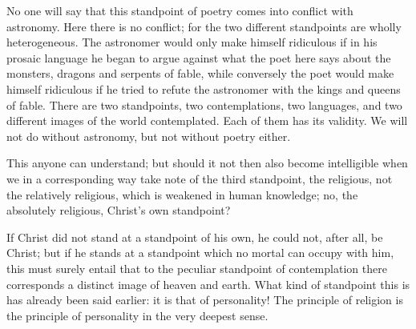 \documentclass[12pt]{book}
\newcommand{\opage}[1]{\marginnote{\footnotesize\textit{[#1]}}}
\begin{document}
No one will say that this standpoint of poetry comes into conflict with
astronomy. Here there is no conflict; for the two different standpoints
are wholly heterogeneous. The astronomer would only make himself ridiculous
if in his prosaic language he began to argue against what the poet here
says about the monsters, dragons and serpents of fable, while conversely
the poet would make himself ridiculous if he tried to refute the astronomer
with the kings and queens of fable. There are two standpoints, two
contemplations, two languages, and two different images of the world
contemplated. Each of them has its validity. We will not do without
astronomy, but not without poetry either.

This anyone can understand; but should it not then also become
intelligible when we in a corresponding way take note of the third
standpoint, the religious, not the relatively religious, which is weakened
in human
\opage{202}\setcounter{footnote}{0}%
knowledge; no, the absolutely religious, Christ's own standpoint?

If Christ did not stand at a standpoint of his own, he could not, after
all, be Christ; but if he stands at a standpoint which no mortal can
occupy with him, this must surely entail that to the peculiar standpoint of
contemplation there corresponds a distinct image of heaven and earth. What
kind of standpoint this is has already been said earlier: it is that of
personality! The principle of religion is the principle of personality in
the very deepest sense.
\end{document}
